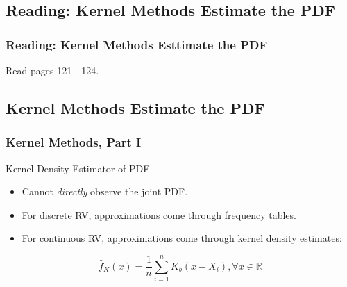 \documentclass[12pt, block=fill]{beamer}
\newcommand{\R}{\mathbb{R}}
\begin{document}
\subsection{Reading: Kernel Methods Estimate the PDF}

\begin{frame}
  \frametitle{Reading: Kernel Methods Esttimate the PDF}
  Read pages 121 - 124.   
\end{frame}
 
\subsection{Kernel Methods Estimate the PDF}

\begin{frame}
  \frametitle{Kernel Methods, Part I}
  \begin{block}{Kernel Density Estimator of PDF}
    \begin{itemize}
    \item Cannot \textit{directly} observe the joint PDF.
    \item For discrete RV, approximations come through frequency
      tables.
    \item For continuous RV, approximations come through kernel
      density estimates:
      \end{itemize} 
    \[
      \hat{f}_{K}(x) = \frac{1}{n} \sum_{i=1}^{n}K_{b}(x - X_{i}),
    \forall x \in \R\]
    
  \end{block}
\end{frame}
\end{document}
